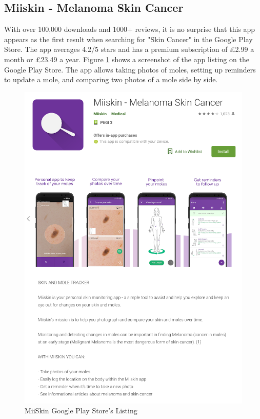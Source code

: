 \subsection{Miiskin - Melanoma Skin Cancer}
With over 100,000 downloads and 1000+ reviews, it is no surprise that this app appears as the first result when searching for "Skin Cancer" in the Google Play Store. The app averages 4.2/5 stars and has a premium subscription of \pounds2.99 a month or \pounds23.49 a year. Figure \ref{fig:miiskin} shows a screenshot of the app listing on the Google Play Store. The app allows taking photos of moles, setting up reminders to update a mole, and comparing two photos of a mole side by side.
\begin{figure}
    \includegraphics[width=1\textwidth, center]{figures/miiskin_listing.png}
    \caption{MiiSkin Google Play Store's Listing}
    \label{fig:miiskin}
\end{figure}

